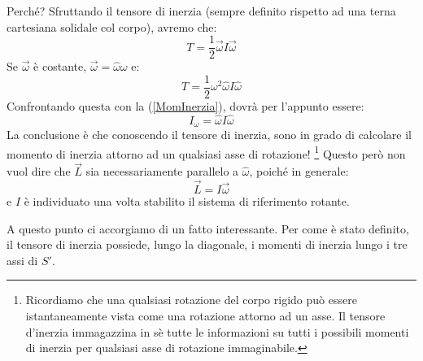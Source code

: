\documentclass[a4paper,openany]{article}
\begin{document}
	Perché? Sfruttando il tensore di inerzia (sempre definito rispetto ad una terna cartesiana solidale col corpo), avremo che:
	$$
	T = \dfrac{1}{2}\vec{\omega}I\vec{\omega}
	$$
	Se $\vec{\omega}$ è costante, $\vec{\omega}=\hat{\omega}\omega$ e:
	$$
	T = \dfrac{1}{2}\omega^{2}\hat{\omega}I\hat{\omega}
	$$
	Confrontando questa con la (\ref{MomInerzia}), dovrà per l'appunto essere:
	$$
	I_{\omega} = \hat{\omega}I\hat{\omega}
	$$
	La conclusione è che conoscendo il tensore di inerzia, sono in grado di calcolare il momento di inerzia attorno ad un qualsiasi asse di rotazione! \footnote{Ricordiamo che una qualsiasi rotazione del corpo rigido può essere istantaneamente vista come una rotazione attorno ad un asse. Il tensore d'inerzia immagazzina in sè tutte le informazioni su tutti i possibili momenti di inerzia per qualsiasi asse di rotazione immaginabile.}
	Questo però non vuol dire che $\vec{L}$ sia necessariamente parallelo a $\hat{\omega}$, poiché in generale:
	$$
	\vec{L} = I\vec{\omega}
	$$
	e $I$ è individuato una volta stabilito il sistema di riferimento rotante.
	
	
	A questo punto ci accorgiamo di un fatto interessante. Per come è stato definito, il tensore di inerzia possiede, lungo la diagonale, i momenti di inerzia lungo i tre assi di $S'$.
	
\end{document}

